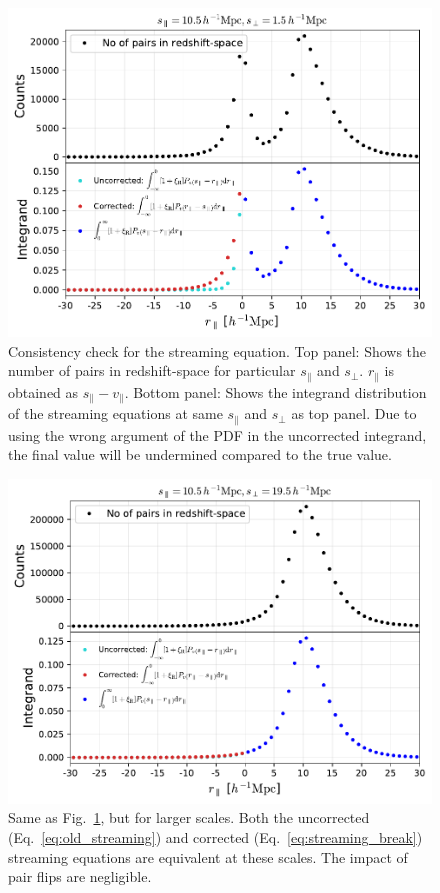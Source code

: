 \documentclass[a4paper,fleqn,usenatbib]{mnras}
\begin{document}
	\begin{figure}
		\centering
		\includegraphics[scale=0.85]{consistency}
		\caption{Consistency check for the streaming equation. Top panel: Shows the number of pairs in redshift-space for particular $s_{\parallel}$ and $s_{\perp}$. $r_{\parallel}$ is obtained as $s_{\parallel} - v_{\parallel}$. Bottom panel: Shows the integrand distribution of the streaming equations at same $s_{\parallel}$ and $s_{\perp}$ as top panel. Due to using the wrong argument of the PDF in the uncorrected integrand, the final value will be undermined compared to the true value.}
		\label{fig:consistency1}
	\end{figure}
	
	\begin{figure}
		\centering
		\includegraphics[scale=0.525]{consistency_}
		\caption{Same as Fig.~\ref{fig:consistency1}, but for larger scales. Both the uncorrected (Eq.~\ref{eq:old_streaming}) and corrected (Eq.~\ref{eq:streaming_break}) streaming equations are equivalent at these scales. The impact of pair flips are negligible.}
		\label{fig:consistency2}
	\end{figure}
	
\end{document}
